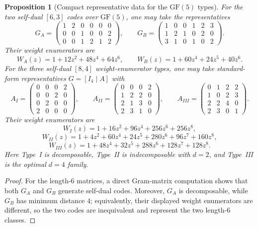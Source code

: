 \documentclass[12pt]{article}
\newtheorem{prop}[theorem]{Proposition}
\newcommand{\GF}[1]{\ensuremath{\mathrm{GF}(#1)}}
\newenvironment{blueblock}{\begingroup\color{blue}}{\endgroup}
\begin{document}
\begin{blueblock}
\begin{prop}[Compact representative data for the $\GF{5}$ types]
\label{prop:gf5-representatives}
For the two self-dual $[6,3]$ codes over $\GF{5}$, one may take the representatives
\[
G_A=
\begin{pmatrix}
1 & 2 & 0 & 0 & 0 & 0\\
0 & 0 & 1 & 0 & 0 & 2\\
0 & 0 & 1 & 2 & 1 & 2
\end{pmatrix},
\qquad
G_B=
\begin{pmatrix}
1 & 0 & 0 & 1 & 2 & 3 \\
1 & 2 & 1 & 0 & 2 & 0 \\
3 & 1 & 0 & 1 & 0 & 2
\end{pmatrix}.
\]
Their weight enumerators are
\[
W_A(z)=1+12z^2+48z^4+64z^6,
\qquad
W_B(z)=1+60z^4+24z^5+40z^6.
\]
For the three self-dual $[8,4]$ weight-enumerator types, one may take standard-form representatives $G=[I_4\mid A]$ with
\[
A_I =
\begin{pmatrix}
0&0&0&2\\
0&0&2&0\\
0&2&0&0\\
2&0&0&0
\end{pmatrix},
\qquad
A_{II} =
\begin{pmatrix}
0&0&0&2\\
1&2&2&0\\
2&1&3&0\\
2&3&1&0
\end{pmatrix},
\qquad
A_{III} =
\begin{pmatrix}
0&1&2&2\\
1&0&2&3\\
2&2&4&0\\
2&3&0&1
\end{pmatrix}.
\]
Their weight enumerators are
\[
W_I(z)=1+16z^2+96z^4+256z^6+256z^8,
\]
\[
W_{II}(z)=1+4z^2+60z^4+24z^5+280z^6+96z^7+160z^8,
\]
\[
W_{III}(z)=1+48z^4+32z^5+288z^6+128z^7+128z^8.
\]
Here Type~I is decomposable, Type~II is indecomposable with $d=2$, and Type~III is the optimal $d=4$ family.
\end{prop}

\begin{proof}
For the length-$6$ matrices, a direct Gram-matrix computation shows that both $G_A$ and $G_B$ generate self-dual codes. Moreover, $G_A$ is decomposable, while $G_B$ has minimum distance $4$; equivalently, their displayed weight enumerators are different, so the two codes are inequivalent and represent the two length-$6$ classes.


\end{proof}
\end{blueblock}
\end{document}
